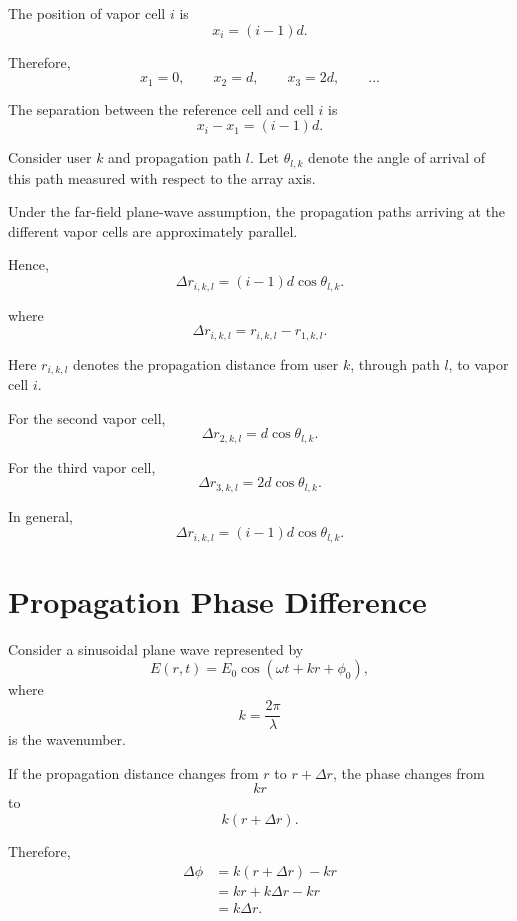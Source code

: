 \documentclass[12pt,a4paper]{article}
\begin{document}
The position of vapor cell \(i\) is
\[
x_i=(i-1)d.
\]

Therefore,
\[
x_1=0,
\qquad
x_2=d,
\qquad
x_3=2d,
\qquad
\ldots
\]

The separation between the reference cell and cell \(i\) is
\[
x_i-x_1
=
(i-1)d.
\]

Consider user \(k\) and propagation path \(l\). Let
\(\theta_{l,k}\) denote the angle of arrival of this path measured
with respect to the array axis.

Under the far-field plane-wave assumption, the propagation paths
arriving at the different vapor cells are approximately parallel.

Hence,
\begin{equation}
\boxed{
\Delta r_{i,k,l}
=
(i-1)d\cos\theta_{l,k}.
}
\tag{5}
\end{equation}

where
\[
\Delta r_{i,k,l}
=
r_{i,k,l}-r_{1,k,l}.
\]

Here \(r_{i,k,l}\) denotes the propagation distance from user \(k\),
through path \(l\), to vapor cell \(i\).

For the second vapor cell,
\[
\Delta r_{2,k,l}
=
d\cos\theta_{l,k}.
\]

For the third vapor cell,
\[
\Delta r_{3,k,l}
=
2d\cos\theta_{l,k}.
\]

In general,
\[
\Delta r_{i,k,l}
=
(i-1)d\cos\theta_{l,k}.
\]



\section{Propagation Phase Difference}

Consider a sinusoidal plane wave represented by
\begin{equation}
E(r,t)
=
E_0
\cos
\left(
\omega t+kr+\phi_0
\right),
\tag{6}
\end{equation}
where
\[
k=\frac{2\pi}{\lambda}
\]
is the wavenumber.

If the propagation distance changes from \(r\) to
\(r+\Delta r\), the phase changes from
\[
kr
\]
to
\[
k(r+\Delta r).
\]

Therefore,
\[
\begin{aligned}
\Delta\phi
&=
k(r+\Delta r)-kr\\
&=
kr+k\Delta r-kr\\
&=
k\Delta r.
\end{aligned}
\]
\end{document}
